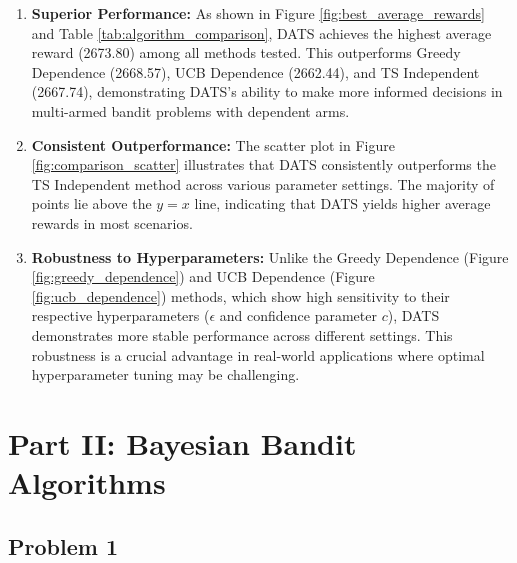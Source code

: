 \documentclass[11pt]{article}
\begin{document}
\begin{enumerate}
    \item \textbf{Superior Performance:} As shown in Figure \ref{fig:best_average_rewards} and Table \ref{tab:algorithm_comparison}, DATS achieves the highest average reward (2673.80) among all methods tested. This outperforms Greedy Dependence (2668.57), UCB Dependence (2662.44), and TS Independent (2667.74), demonstrating DATS's ability to make more informed decisions in multi-armed bandit problems with dependent arms.

    \item \textbf{Consistent Outperformance:} The scatter plot in Figure \ref{fig:comparison_scatter} illustrates that DATS consistently outperforms the TS Independent method across various parameter settings. The majority of points lie above the $y=x$ line, indicating that DATS yields higher average rewards in most scenarios.

    \item \textbf{Robustness to Hyperparameters:} Unlike the Greedy Dependence (Figure \ref{fig:greedy_dependence}) and UCB Dependence (Figure \ref{fig:ucb_dependence}) methods, which show high sensitivity to their respective hyperparameters ($\epsilon$ and confidence parameter $c$), DATS demonstrates more stable performance across different settings. This robustness is a crucial advantage in real-world applications where optimal hyperparameter tuning may be challenging.
\end{enumerate}

\newpage
\section{Part II: Bayesian Bandit Algorithms}
\subsection{Problem 1}
\end{document}

